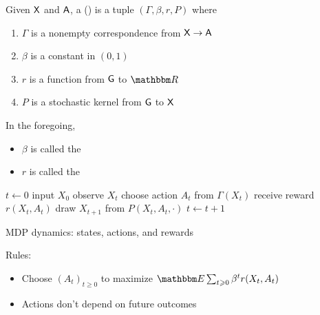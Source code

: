 \begin{frame}

    Given $\mathsf X$ and $\mathsf A$, a 
     () is a tuple $(\Gamma, \beta, r, P)$ where
    \begin{enumerate}
        \item $\Gamma$ is a nonempty correspondence from $\mathsf X \to \mathsf A$
    \vspace{0.5em}
        \item $\beta$ is a constant in $(0, 1)$
    \vspace{0.5em}
        \item $r$ is a function from $\mathsf G$ to $\RR$
    \vspace{0.5em}
        \item $P$ is a stochastic kernel from $\mathsf G$
            to $\mathsf X$
    \vspace{0.5em}
    \end{enumerate}
       
    \vspace{0.5em}
    In the foregoing,
    \begin{itemize}
        \item $\beta$ is called the 
    \vspace{0.5em}
        \item $r$ is called the 
    \end{itemize}

\end{frame}


\begin{frame}
    
    {\small
    \begin{algorithm}[H]
    \DontPrintSemicolon
    $t \leftarrow 0$ \;
    input $X_0$ \;
    {
        observe $X_t$   \;
        choose action $A_t$ from $\Gamma(X_t)$  \;
        receive reward $r(X_t, A_t)$   \;
        draw $X_{t+1}$ from $P(X_t, A_t, \cdot)$   \;
        $t \leftarrow t + 1$ \;
    }
    \caption{\label{algo:d_mdp} MDP dynamics: states, actions, and rewards}
    \end{algorithm}
    }

    \vspace{0.5em}
    Rules:
    \begin{itemize}
        \item Choose $(A_t)_{t \geq 0}$ to maximize $\EE \sum_{t \geq 0}
            \beta^t r(X_t, A_t)$
        \item Actions don't depend on future outcomes 
    \end{itemize}

\end{frame}




